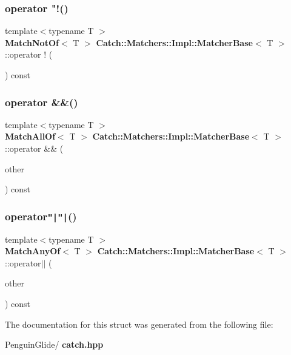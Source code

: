 \subsubsection{operator "!()}
{\footnotesize\ttfamily template$<$typename T $>$ \\
\textbf{ Match\+Not\+Of}$<$ T $>$ \textbf{ Catch\+::\+Matchers\+::\+Impl\+::\+Matcher\+Base}$<$ T $>$\+::operator ! (\begin{DoxyParamCaption}{ }\end{DoxyParamCaption}) const}

\mbox{\label{struct_catch_1_1_matchers_1_1_impl_1_1_matcher_base_aac4472c84f76c242ab4467f02e2ef8cc}} 
\subsubsection{operator \&\&()}
{\footnotesize\ttfamily template$<$typename T $>$ \\
\textbf{ Match\+All\+Of}$<$ T $>$ \textbf{ Catch\+::\+Matchers\+::\+Impl\+::\+Matcher\+Base}$<$ T $>$\+::operator \&\& (\begin{DoxyParamCaption}\item[{\textbf{ Matcher\+Base}$<$ T $>$ const \&}]{other }\end{DoxyParamCaption}) const}

\mbox{\label{struct_catch_1_1_matchers_1_1_impl_1_1_matcher_base_a5f8542b8f1567a6f9c65d0a6da7b679b}} 
\subsubsection{operator\texttt{"|}\texttt{"|}()}
{\footnotesize\ttfamily template$<$typename T $>$ \\
\textbf{ Match\+Any\+Of}$<$ T $>$ \textbf{ Catch\+::\+Matchers\+::\+Impl\+::\+Matcher\+Base}$<$ T $>$\+::operator$\vert$$\vert$ (\begin{DoxyParamCaption}\item[{\textbf{ Matcher\+Base}$<$ T $>$ const \&}]{other }\end{DoxyParamCaption}) const}



The documentation for this struct was generated from the following file\+:\begin{DoxyCompactItemize}
\item 
Penguin\+Glide/\textbf{ catch.\+hpp}\end{DoxyCompactItemize}
